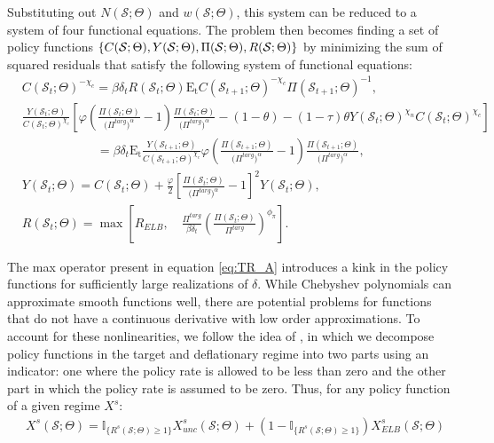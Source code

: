 \documentclass[11pt]{article}
\begin{document}
\begin{singlespace}
	\noindent
	Substituting out $N(\mathcal{S};\Theta)$ and $w(\mathcal{S};\Theta)$, this system can be reduced to a system of four functional equations. The problem then becomes finding a set of policy functions $\{C(\mathcal{S};\Theta),Y(\mathcal{S};\Theta),\\ \Pi(\mathcal{S};\Theta), R(\mathcal{S};\Theta)\}$ by minimizing the sum of squared residuals that satisfy the following system of functional equations:
	    \begin{align}
		& C(\mathcal{S}_{t};\Theta)^{-\chi_{c}} = \beta\delta_{t}R(\mathcal{S}_{t};\Theta)\mathrm{E_{t}}C(\mathcal{S}_{t+1};\Theta)^{-\chi_{c}}\Pi(\mathcal{S}_{t+1};\Theta)^{-1},\label{eq:CEE_A}\\
		& \frac{Y(\mathcal{S}_{t};\Theta)}{C(\mathcal{S}_{t};\Theta)^{\chi_{c}}}\left[\varphi \left(\frac{\Pi(\mathcal{S}_{t};\Theta)}{\bigl(\Pi^{targ}\bigr)^{\alpha}}-1\right)\frac{\Pi(\mathcal{S}_{t};\Theta)}{\bigl(\Pi^{targ}\bigr)^{\alpha}} - (1-\theta)- (1-\tau)\theta Y(\mathcal{S}_{t};\Theta)^{\chi_{n}}C(\mathcal{S}_{t};\Theta)^{\chi_{c}}\right]\\ \nonumber
		& \hspace{6em}= \beta\delta_{t}\mathrm{E_{t}}\frac{Y(\mathcal{S}_{t+1};\Theta)}{C(\mathcal{S}_{t+1};\Theta)^{\chi_{c}}}\varphi \left(\frac{\Pi(\mathcal{S}_{t+1};\Theta)}{\bigl(\Pi^{targ}\bigr)^{\alpha}}-1\right)\frac{\Pi(\mathcal{S}_{t+1};\Theta)}{\bigl(\Pi^{targ}\bigr)^{\alpha}},\\
		& Y(\mathcal{S}_{t};\Theta) = C(\mathcal{S}_{t};\Theta) + \frac{\varphi}{2}\left[\frac{\Pi(\mathcal{S}_{t};\Theta)}{\bigl(\Pi^{targ}\bigr)^{\alpha}}-1\right]^{2}Y(\mathcal{S}_{t};\Theta),\label{eq:ARC_A}\\
		& R(\mathcal{S}_{t};\Theta) = \max \left[R_{ELB}, \quad\frac{\Pi^{targ}}{\beta\delta_t}\left(\frac{\Pi(\mathcal{S}_{t};\Theta)}{\Pi^{targ}}\right)^{\phi_{\pi}}\right].\label{eq:TR_A}
	\end{align}

	The max operator present in equation \ref{eq:TR_A} introduces a kink in the policy functions for sufficiently large realizations of $\delta$. While Chebyshev polynomials can approximate smooth functions well, there are potential problems for functions that do not have a continuous derivative with low order approximations. To account for these nonlinearities, we follow the idea of \citet{ChristianoFisher2000}, in which we decompose policy functions in the target and deflationary regime into two parts using an indicator: one where the policy rate is allowed to be less than zero and the other part in which the policy rate is assumed to be zero. Thus, for any policy function of a given regime $X^s$:
	\begin{align}
	    & X^s(\mathcal{S};\Theta) = \mathbb{I}_{\{R^s(\mathcal{S};\Theta)\ge 1\}}X_{unc}^{s}(\mathcal{S};\Theta) + (1 - \mathbb{I}_{\{R^s(\mathcal{S};\Theta)\ge 1\}})X_{ELB}^{s}(\mathcal{S};\Theta)
	\end{align}


\end{singlespace}
\end{document}
